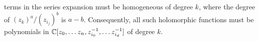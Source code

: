 terms in the series expansion must be homogeneous of degree $k$, where the
degree of $(z_k)^a/(z_{i_j})^b$ is $a - b$. Consequently, all such holomorphic
functions must be polynomials in $\mathbb{C}[z_0, \ldots z_n, z_{i_0}^{-1}, \ldots z_{i_d}^{-1}]$
of degree $k$.
\iffalse
We now compute the $n^{th}$ cohomology groups.
%
\begin{thm}
\[
\check{H}^i(\mathcal{U}, \O(k)) = \begin{cases}
\C[z_0, \ldots z_n]_{-k-n-1} & -k-n-1 \geq 0 \\
0 & \text{otherwise}
\end{cases}
\]
\end{thm}
%
\begin{proof}
Since $C^{n+1}(\mathcal{U}, \O(k)) = 0$, we have that
$\check{H}^n(\mathcal{U},\O(k))$ is just the cokernel of the differential
$d : C^{n-1}(\mathcal{U}, \O(k)) \to C^n(\mathcal{U}, \O(k))$.
\end{proof}
\fi
%
%